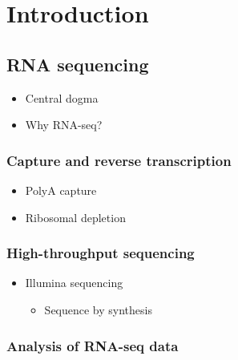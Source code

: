 \documentclass[11pt,a4paper,titlepage,twoside,openright]{style/unimelbthesis}
\theoremstyle{definition}
\theoremstyle{definition}
\theoremstyle{definition}
\theoremstyle{remark}
\begin{document}
\begin{mainmatter}

\hypertarget{introduction}{%
\chapter{Introduction}\label{introduction}}

\hypertarget{rna-sequencing}{%
\section{RNA sequencing}\label{rna-sequencing}}

\begin{itemize}
\tightlist
\item
  Central dogma
\item
  Why RNA-seq?
\end{itemize}

\hypertarget{capture-and-reverse-transcription}{%
\subsection{Capture and reverse transcription}\label{capture-and-reverse-transcription}}

\begin{itemize}
\tightlist
\item
  PolyA capture
\item
  Ribosomal depletion
\end{itemize}

\hypertarget{high-throughput-sequencing}{%
\subsection{High-throughput sequencing}\label{high-throughput-sequencing}}

\begin{itemize}
\tightlist
\item
  Illumina sequencing

  \begin{itemize}
  \tightlist
  \item
    Sequence by synthesis
  \end{itemize}
\end{itemize}

\hypertarget{analysis-of-rna-seq-data}{%
\subsection{Analysis of RNA-seq data}\label{analysis-of-rna-seq-data}}


\end{mainmatter}
\end{document}
